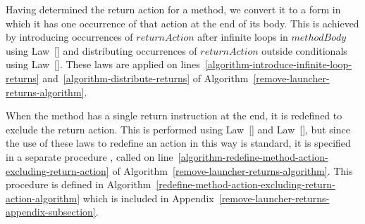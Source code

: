 Having determined the return action for a method, we convert it to a
form in which it has one occurrence of that action at the end of its
body.
This is achieved by introducing occurrences of $returnAction$ after
infinite loops in $methodBody$ using
Law~[] and distributing occurrences of
$returnAction$ outside conditionals using
Law~[].
These laws are applied on
lines~\ref{algorithm-introduce-infinite-loop-returns}
and~\ref{algorithm-distribute-returns} of
Algorithm~\ref{remove-launcher-returns-algorithm}.

When the method has a single return instruction at the end, it is
redefined to exclude the return action.
This is performed using Law~[] and
Law~[], but since the use of these laws to
redefine an action in this way is standard, it is specified in a
separate procedure
,
called on
line~\ref{algorithm-redefine-method-action-excluding-return-action} of
Algorithm~\ref{remove-launcher-returns-algorithm}.
This procedure is defined in
Algorithm~\ref{redefine-method-action-excluding-return-action-algorithm}
which is included in
Appendix~\ref{remove-launcher-returns-appendix-subsection}.

